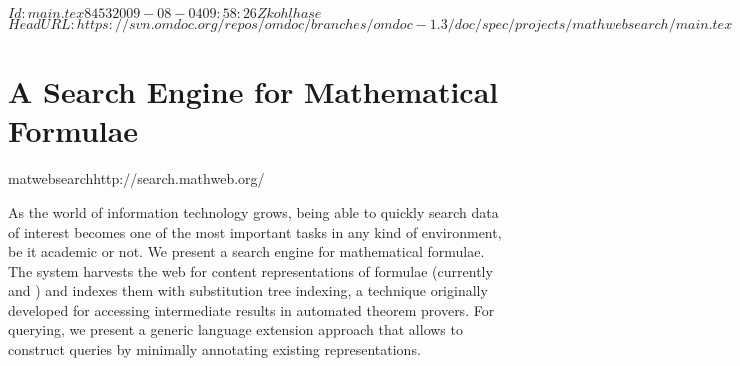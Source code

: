 \svnInfo $Id: main.tex 8453 2009-08-04 09:58:26Z kohlhase $
\svnKeyword $HeadURL: https://svn.omdoc.org/repos/omdoc/branches/omdoc-1.3/doc/spec/projects/mathwebsearch/main.tex $

\section{A Search Engine for Mathematical Formulae}
\begin{project}{matwebsearch}{http://search.mathweb.org/}
\end{project}

As the world of information technology grows, being able to quickly search data of
interest becomes one of the most important tasks in any kind of environment, be it
academic or not. We present a search engine for mathematical formulae. The {\mmlsearch}
system harvests the web for content representations of formulae (currently {\mathml} and
{\openmath}) and indexes them with substitution tree indexing, a technique originally
developed for accessing intermediate results in automated theorem provers. For querying,
we present a generic language extension approach that allows to construct queries by
minimally annotating existing representations.

